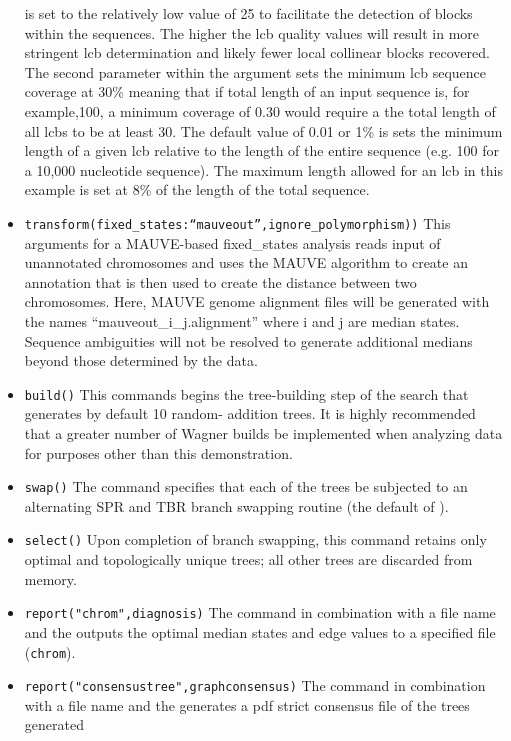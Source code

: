 \begin{itemize}
is set to the relatively low value of 25 to facilitate the detection of blocks within the sequences.  The higher the lcb 
quality values will result in more stringent lcb determination and likely fewer local collinear blocks recovered.  The 
second parameter within the argument  sets the minimum lcb sequence coverage at 
30\% meaning that if total length of an input sequence is, for example,100, a minimum coverage of 0.30 would require 
a the total length of all lcbs to be at least 30. The default value of 0.01 or 1\% is sets the minimum length of a given lcb 
relative to the length of the entire sequence (e.g. 100 for a 10,000 nucleotide sequence). The maximum length 
allowed for an lcb in this example is set at 8\% of the length of the total sequence.
\item \texttt{transform(fixed\_states:``mauveout'',ignore\_polymorphism))} This arguments for a MAUVE-based fixed\_states 
analysis reads input of unannotated chromosomes and uses the MAUVE algorithm to create an annotation that is then used to 
create the distance between two chromosomes. Here, MAUVE genome alignment files will be generated with the names 
``mauveout\_i\_j.alignment'' where i and j are median states. Sequence ambiguities will not be resolved to generate additional 
medians beyond those determined by the data.
\item \texttt{build()} This commands begins the tree-building step of the search that generates by default 10 random-
addition trees. It is highly recommended that a greater number of Wagner builds be implemented when analyzing 
data for purposes other than this demonstration.
\item \texttt{swap()} The  command specifies that each of the trees be subjected to an alternating 
SPR and TBR branch swapping routine (the default of \poy).
\item \texttt{select()} Upon completion of branch swapping, this command retains only optimal and topologically 
unique trees; all other trees are discarded from memory. 
\item \texttt{report("chrom",diagnosis)}  The  command in combination with a file name and the 
 outputs the optimal median states and edge values to a specified file (\texttt{chrom}). 
\item \texttt{report("consensustree",graphconsensus)}  The  command in combination with a file 
name and the  generates a pdf strict consensus file of the trees generated 

\end{itemize}
